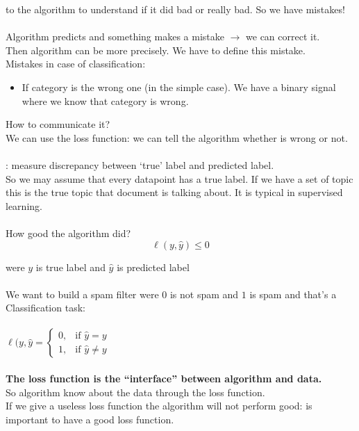 \documentclass[../main.tex]{subfiles}
\begin{document}
to the algorithm to understand if it did bad or really bad.
So we have mistakes!\\\\
Algorithm predicts and something makes a mistake $\rightarrow$ we can correct it.\\
Then algorithm can be more precisely.
We have to define this mistake.\\
Mistakes in case of classification:\\
\begin{itemize}
\item If category is the wrong one (in the simple case). We have a binary signal
where we know that category is wrong.
\end{itemize}
How to communicate it?\\
We can use the loss function: we can tell the algorithm whether is wrong or
not.\\\\
: measure discrepancy between ‘true’ label and predicted
label.\\
So we may assume that every datapoint has a true label.
If we have a set of topic this is the true topic that document is talking about.
It is typical in supervised learning.
\\\\
How good the algorithm did?
\\

\[\ell(y,\hat{y})\leq0 \]

were $y $ is true label and $\hat{y}$ is predicted label
\\\\
We want to build a spam filter were $0$ is not spam and $1$ is spam and that's a
Classification task: 
\\\\
$
\ell(y,\hat{y} = \begin{cases} 0, & \mbox{if } \hat{y} = y 
\\ 1, & 
\mbox{if }\hat{y} \neq y
\end{cases}
$
\\\\
\textbf{The loss function is the “interface” between algorithm and data.}\\
So algorithm know about the data through the loss function.\\
If we give a useless loss function the algorithm will not perform good: is
important to have a good loss function.
\end{document}

